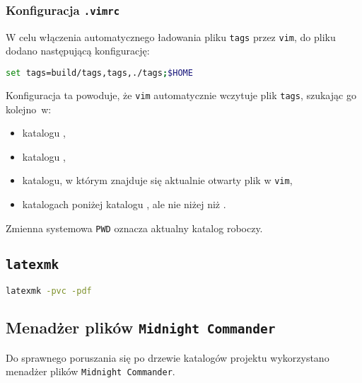 \documentclass[thesis]{subfiles}
\begin{document}
\subsubsection{Konfiguracja \texttt{.vimrc}}

W celu włączenia automatycznego ładowania pliku \texttt{tags} przez \texttt{vim}, do pliku  dodano następującą konfigurację:
\begin{lstlisting}[language=bash,numbers=none,caption={Konfiguracja \texttt{.vimrc}}]
set tags=build/tags,tags,./tags;$HOME
\end{lstlisting}
Konfiguracja ta powoduje, że \texttt{vim} automatycznie wczytuje plik \texttt{tags}, szukając go kolejno~w:
\begin{itemize}[font=\ttfamily]
	\item katalogu ,
	\item katalogu ,
	\item katalogu, w którym znajduje się aktualnie otwarty plik w \texttt{vim},
	\item katalogach poniżej katalogu , ale nie niżej niż .
\end{itemize}
Zmienna systemowa \texttt{\gls{PWD}} oznacza aktualny katalog roboczy.

\subsection{\texttt{latexmk}}

\begin{lstlisting}[language=bash,numbers=none,caption={Uruchomienie ciągłej kompilacji \LaTeX do PDF}]
latexmk -pvc -pdf
\end{lstlisting}

\subsection{Menadżer plików \texttt{Midnight Commander}}

Do sprawnego poruszania się po drzewie katalogów projektu wykorzystano menadżer plików \texttt{Midnight~Commander}.
\end{document}
